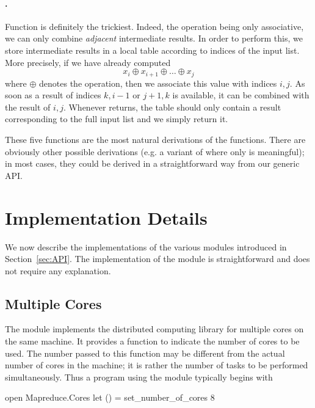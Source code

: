 \documentclass[preprint]{sigplanconf}
\begin{document}
\paragraph{.}
Function  is definitely the trickiest. Indeed, the
operation being only associative, we can only combine \emph{adjacent}
intermediate results. In order to perform this, we store intermediate
results in a local table according to indices of the input list. More
precisely, if we have already computed
\begin{displaymath}
  x_i \oplus x_{i+1} \oplus \dots \oplus x_j
\end{displaymath}
where $\oplus$ denotes the  operation, then we associate this
value with indices $i,j$. As soon as a result of indices $k,i-1$ or
$j+1,k$ is available, it can be combined with the result of $i,j$.
Whenever  returns, the table should only contain a result
corresponding to the full input list and we simply return it.

\medskip
These five functions are the most natural derivations of the
 functions. There are obviously other possible derivations
(e.g. a variant of  where only  is meaningful);
in most cases, they could be derived in a straightforward way from our
generic API.


\section{Implementation Details}\label{sec:implem}

We now describe the implementations of the various modules introduced
in Section~\ref{sec:API}. The implementation of the 
module is straightforward and does not require any explanation.

\subsection{Multiple Cores}

The  module implements the distributed computing library for
multiple cores on the same machine. It provides a function
 to indicate the number of cores
to be used. The number passed to this function may be different from
the actual number of cores in the machine; it is rather the number of
tasks to be performed simultaneously.
Thus a program using the  module typically begins with 
\begin{ocaml}
open Mapreduce.Cores
let () = set_number_of_cores 8
\end{ocaml}
\end{document}
